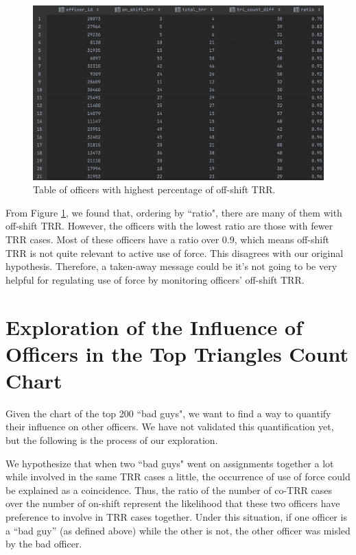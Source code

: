 \documentclass[10pt]{article}
\begin{document}
\begin{figure}[H]
\centering
\includegraphics[width=\textwidth]{offshift}
\caption{Table of officers with highest percentage of off-shift TRR.}
\label{offshift}
\end{figure}

From Figure \ref{offshift}, we found that, ordering by ``ratio", there are many of them with off-shift TRR. However, the officers with the lowest ratio are those with fewer TRR cases. Most of these officers have a ratio over 0.9, which means off-shift TRR is not quite relevant to active use of force. This disagrees with our original hypothesis. Therefore, a taken-away message could be it’s not going to be very helpful for regulating use of force by monitoring officers' off-shift TRR.




\section{Exploration of the Influence of Officers in the Top Triangles Count Chart}

Given the chart of the top 200 ``bad guys", we want to find a way to quantify their influence on other officers. We have not validated this quantification yet, but the following is the process of our exploration.

We hypothesize that when two ``bad guys" went on assignments together a lot while involved in the same TRR cases a little, the occurrence of use of force could be explained as a coincidence. Thus, the ratio of the number of co-TRR cases over the number of on-shift represent the likelihood that these two officers have preference to involve in TRR cases together. Under this situation, if one officer is a “bad guy” (as defined above) while the other is not, the other officer was misled by the bad officer.
\end{document}
